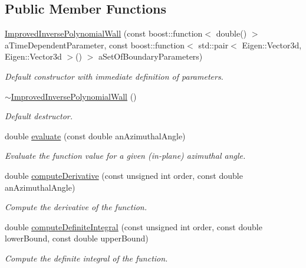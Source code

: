 \subsection*{Public Member Functions}
\begin{DoxyCompactItemize}
\item 
\hyperlink{classtudat_1_1mission__segments_1_1ImprovedInversePolynomialWall_a7a3107f44326b49bff1152442333179e}{Improved\+Inverse\+Polynomial\+Wall} (const boost\+::function$<$ double() $>$ a\+Time\+Dependent\+Parameter, const boost\+::function$<$ std\+::pair$<$ Eigen\+::\+Vector3d, Eigen\+::\+Vector3d $>$() $>$ a\+Set\+Of\+Boundary\+Parameters)
\begin{DoxyCompactList}\small\item\em Default constructor with immediate definition of parameters. \end{DoxyCompactList}\item 
\hyperlink{classtudat_1_1mission__segments_1_1ImprovedInversePolynomialWall_aae77824552261821ddeb2a64aeaa5f0a}{$\sim$\+Improved\+Inverse\+Polynomial\+Wall} ()
\begin{DoxyCompactList}\small\item\em Default destructor. \end{DoxyCompactList}\item 
double \hyperlink{classtudat_1_1mission__segments_1_1ImprovedInversePolynomialWall_a9fe09f98e8bb360bba7b90d5462150ca}{evaluate} (const double an\+Azimuthal\+Angle)
\begin{DoxyCompactList}\small\item\em Evaluate the function value for a given (in-\/plane) azimuthal angle. \end{DoxyCompactList}\item 
double \hyperlink{classtudat_1_1mission__segments_1_1ImprovedInversePolynomialWall_aeac28ab0027cf43dbb2e443ddd133d67}{compute\+Derivative} (const unsigned int order, const double an\+Azimuthal\+Angle)
\begin{DoxyCompactList}\small\item\em Compute the derivative of the function. \end{DoxyCompactList}\item 
double \hyperlink{classtudat_1_1mission__segments_1_1ImprovedInversePolynomialWall_aafcdb10c4212c31db81a955030719e01}{compute\+Definite\+Integral} (const unsigned int order, const double lower\+Bound, const double upper\+Bound)
\begin{DoxyCompactList}\small\item\em Compute the definite integral of the function. \end{DoxyCompactList}\end{DoxyCompactItemize}


